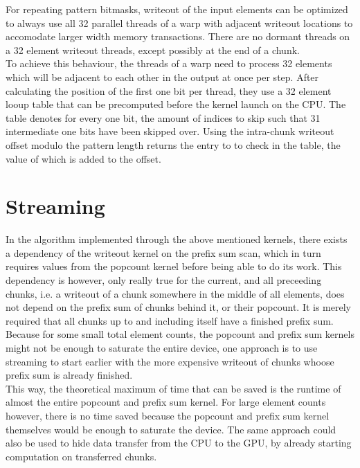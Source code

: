 \documentclass{tudscrreprt}
\begin{document}
			For repeating pattern bitmasks, writeout of the input elements can be optimized to always use all 32 parallel threads of a warp with adjacent writeout locations to accomodate larger width memory transactions. There are no dormant threads on a 32 element writeout threads, except possibly at the end of a chunk. \\
			To achieve this behaviour, the threads of a warp need to process 32 elements which will be adjacent to each other in the output at once per step. After calculating the position of the first one bit per thread, they use a 32 element looup table that can be precomputed before the kernel launch on the CPU. The table denotes for every one bit, the amount of indices to skip such that 31 intermediate one bits have been skipped over. Using the intra-chunk writeout offset modulo the pattern length returns the entry to to check in the table, the value of which is added to the offset. \\
		
		\section{Streaming}
			In the algorithm implemented through the above mentioned kernels, there exists a dependency of the writeout kernel on the prefix sum scan, which in turn requires values from the popcount kernel before being able to do its work. This dependency is however, only really true for the current, and all preceeding chunks, i.e. a writeout of a chunk somewhere in the middle of all elements, does not depend on the prefix sum of chunks behind it, or their popcount. It is merely required that all chunks up to and including itself have a finished prefix sum. \\
			Because for some small total element counts, the popcount and prefix sum kernels might not be enough to saturate the entire device, one approach is to use streaming to start earlier with the more expensive writeout of chunks whoose prefix sum is already finished. \\
			This way, the theoretical maximum of time that can be saved is the runtime of almost the entire popcount and prefix sum kernel. For large element counts however, there is no time saved because the popcount and prefix sum kernel themselves would be enough to saturate the device. The same approach could also be used to hide data transfer from the CPU to the GPU, by already starting computation on transferred chunks. \\
			
\end{document}
